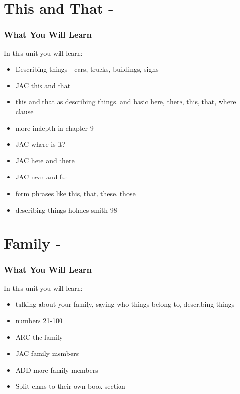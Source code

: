 \chapter*{This and That - }
\subsection{What You Will Learn}
In this unit you will learn:
\begin{itemize}
\item Describing things - cars, trucks, buildings, signs
\item JAC this and that
\item this and that as describing things.  and basic here, there, this, that, where clause
\item more indepth in chapter 9
\item JAC where is it?
\item JAC here and there
\item JAC near and far
\item form phrases like this, that, these, those
\item describing things holmes smith 98
\end{itemize}\newpage

\newpage{}
\index{}
\chapter*{Family - }
\subsection{What You Will Learn}
In this unit you will learn:
\begin{itemize}
\item talking about your family, saying who things belong to, describing things
\item numbers 21-100
\item ARC the family
\item JAC family members
\item ADD more family members
\item Split clans to their own book section
\end{itemize}\newpage

